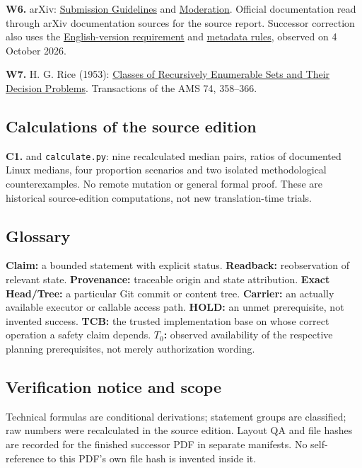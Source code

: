 \begin{cols}
\textbf{W6.} arXiv: \href{https://info.arxiv.org/help/submit/index.html}{Submission Guidelines} and \href{https://info.arxiv.org/help/moderation/index.html}{Moderation}. Official documentation read through arXiv documentation sources for the source report. Successor correction also uses the \href{https://info.arxiv.org/help/faq/multilang.html}{English-version requirement} and \href{https://info.arxiv.org/help/prep.html}{metadata rules}, observed on 4 October 2026.

\textbf{W7.} H. G. Rice (1953): \href{https://www.ams.org/journals/tran/1953-074-02/S0002-9947-1953-0053041-6/S0002-9947-1953-0053041-6.pdf}{Classes of Recursively Enumerable Sets and Their Decision Problems}. Transactions of the AMS 74, 358--366.

\subsection*{Calculations of the source edition}
\textbf{C1.}  and \texttt{calculate.py}: nine recalculated median pairs, ratios of documented Linux medians, four proportion scenarios and two isolated methodological counterexamples. No remote mutation or general formal proof. These are historical source-edition computations, not new translation-time trials.

\subsection*{Glossary}
\textbf{Claim:} a bounded statement with explicit status. \textbf{Readback:} reobservation of relevant state. \textbf{Provenance:} traceable origin and state attribution. \textbf{Exact Head/Tree:} a particular Git commit or content tree. \textbf{Carrier:} an actually available executor or callable access path. \textbf{HOLD:} an unmet prerequisite, not invented success. \textbf{TCB:} the trusted implementation base on whose correct operation a safety claim depends. \textbf{$T_0$:} observed availability of the respective planning prerequisites, not merely authorization wording.

\subsection*{Verification notice and scope}
Technical formulas are conditional derivations; statement groups are classified; raw numbers were recalculated in the source edition. Layout QA and file hashes are recorded for the finished successor PDF in separate manifests. No self-reference to this PDF's own file hash is invented inside it.


\end{cols}

